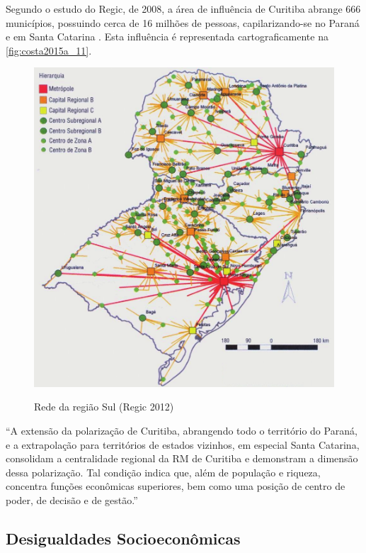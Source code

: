 	Segundo o estudo do Regic, de 2008, a área de influência de Curitiba abrange 666 municípios, possuindo cerca de 16 milhões de pessoas, capilarizando-se no Paraná e em Santa Catarina \cite[p. 16]{costa2015a}. Esta influência é representada cartograficamente na \autoref{fig:costa2015a_11}.
	
	\begin{figure}
		\centering
		\caption{Rede da região Sul (Regic 2012)}
		\includegraphics[width=1.0\linewidth]{img/costa2015a_11}
		\label{fig:costa2015a_11}
	\end{figure}
	
	\begin{citacao}
		``A extensão da polarização de Curitiba, abrangendo todo o território do Paraná, e a extrapolação para territórios de estados vizinhos, em especial Santa Catarina, consolidam a centralidade regional da RM de Curitiba e demonstram a dimensão dessa polarização. Tal condição indica que, além de população e riqueza, concentra funções econômicas superiores, bem como uma posição de centro de poder, de decisão e de gestão.'' 
	\end{citacao}
	
	\subsection{Desigualdades Socioeconômicas}
	
